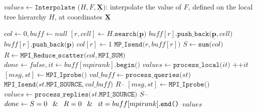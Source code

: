 \begin{algorithm}[htbp]
\caption{$values \gets \texttt{Interpolate (}H, F, \underline{\mathbf{X}}\texttt{)}$: interpolate the value of $F$, defined on the local tree hierarchy $H$, at coordinates $\underline{\mathbf{X}}$}
\begin{algorithmic}[1]
\State $col \gets 0, \mathit{buff} \gets null$ 
	\State $[r, cell] \gets H.\texttt{search(}\underline{\mathbf{p}}\texttt{)}$ 
        \State $\mathit{buff}[r].\texttt{push\_back(}\underline{\mathbf{p}}, cell\texttt{)}$
	\Else
        \State $\mathit{buff}[r].\texttt{push\_back(}\underline{\mathbf{p}}\texttt{)}$
        \State $\mathit{col}[r] \gets 1$
	\EndIf
\EndFor
{} 
        \State $\texttt{MP\_Isend(}r, \mathit{buff}[r]\texttt{)}$
	\EndIf
\EndFor
\State  $S \gets \texttt{sum(}col\texttt{)}$ 
\State  $R \gets \texttt{MPI\_Reduce\_scatter(}col,\texttt{MPI\_SUM)}$
\State $done \gets \mathit{false}, it \gets \mathit{buff}[mpirank].\texttt{begin()}$
 
		\State $values \gets \texttt{process\_local(}it\texttt{)}$ 
		\State $\texttt{++}it$
	\EndIf
	 
		\State $[msg, st] \gets \texttt{MPI\_Iprobe()}$
			\State $val\_buff \gets \texttt{process\_queries(}st\texttt{)}$ 
			\State $\texttt{MPI\_Isend(}st.\texttt{MPI\_SOURCE},val\_buff\texttt{)}$ 
			\State $R\texttt{--}$
		\EndIf
	\EndIf
	 
		\State $[msg, st] \gets \texttt{MPI\_Iprobe()}$
			\State $values \gets \texttt{process\_replies(}st.\texttt{MPI\_SOURCE)}$ 
			\State $S\texttt{--}$
		\EndIf
	\EndIf
	\State $done \gets S = 0 \: \And \: R = 0 \: \And \: it = buff[mpirank].\texttt{end()}$
\EndWhile
\State \Return $values$
\end{algorithmic}
\label{alg:interpolation}
\end{algorithm}

